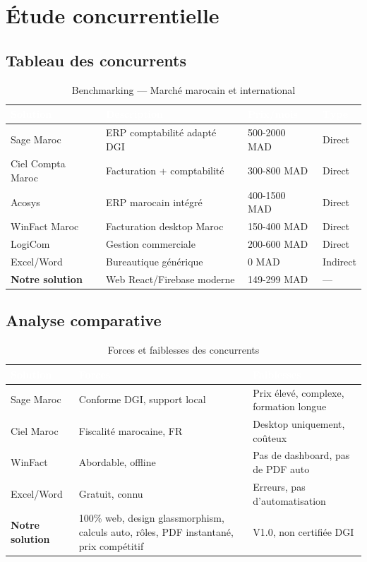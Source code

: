 \section{Étude concurrentielle}

\subsection{Tableau des concurrents}

\begin{table}[H]
\centering
\caption{Benchmarking — Marché marocain et international}
\label{tab:concurrents}
\begin{tabularx}{\textwidth}{|l|X|l|l|}
\hline
\rowcolor{emsiblue}\textcolor{white}{\textbf{Solution}} & \textcolor{white}{\textbf{Description}} & \textcolor{white}{\textbf{Prix/mois}} & \textcolor{white}{\textbf{Type}} \\
\hline
Sage Maroc & ERP comptabilité adapté DGI & 500-2000 MAD & Direct \\
Ciel Compta Maroc & Facturation + comptabilité & 300-800 MAD & Direct \\
Acosys & ERP marocain intégré & 400-1500 MAD & Direct \\
WinFact Maroc & Facturation desktop Maroc & 150-400 MAD & Direct \\
LogiCom & Gestion commerciale & 200-600 MAD & Direct \\
Excel/Word & Bureautique générique & 0 MAD & Indirect \\
\textbf{Notre solution} & Web React/Firebase moderne & 149-299 MAD & --- \\
\hline
\end{tabularx}
\end{table}

\subsection{Analyse comparative}

\begin{table}[H]
\centering
\caption{Forces et faiblesses des concurrents}
\label{tab:analyse_concurrents}
\begin{tabularx}{\textwidth}{|l|X|X|}
\hline
\rowcolor{emsiblue}\textcolor{white}{\textbf{Solution}} & \textcolor{white}{\textbf{Forces}} & \textcolor{white}{\textbf{Faiblesses}} \\
\hline
Sage Maroc & Conforme DGI, support local & Prix élevé, complexe, formation longue \\
Ciel Maroc & Fiscalité marocaine, FR & Desktop uniquement, coûteux \\
WinFact & Abordable, offline & Pas de dashboard, pas de PDF auto \\
Excel/Word & Gratuit, connu & Erreurs, pas d'automatisation \\
\textbf{Notre solution} & 100\% web, design glassmorphism, calculs auto, rôles, PDF instantané, prix compétitif & V1.0, non certifiée DGI \\
\hline
\end{tabularx}
\end{table}

